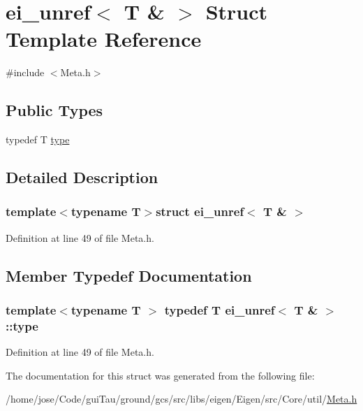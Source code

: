 \hypertarget{structei__unref_3_01_t_01_6_01_4}{\section{ei\-\_\-unref$<$ T \& $>$ Struct Template Reference}
\label{structei__unref_3_01_t_01_6_01_4}
}


{\ttfamily \#include $<$Meta.\-h$>$}

\subsection*{Public Types}
\begin{DoxyCompactItemize}
\item 
typedef T \hyperlink{structei__unref_3_01_t_01_6_01_4_acd5f4cab79b94a92a9dd8cbf9e54af05}{type}
\end{DoxyCompactItemize}


\subsection{Detailed Description}
\subsubsection*{template$<$typename T$>$struct ei\-\_\-unref$<$ T \& $>$}



Definition at line 49 of file Meta.\-h.



\subsection{Member Typedef Documentation}
\hypertarget{structei__unref_3_01_t_01_6_01_4_acd5f4cab79b94a92a9dd8cbf9e54af05}{
\subsubsection[{type}]{\setlength{\rightskip}{0pt plus 5cm}template$<$typename T $>$ typedef T {\bf ei\-\_\-unref}$<$ T \& $>$\-::{\bf type}}}\label{structei__unref_3_01_t_01_6_01_4_acd5f4cab79b94a92a9dd8cbf9e54af05}


Definition at line 49 of file Meta.\-h.



The documentation for this struct was generated from the following file\-:\begin{DoxyCompactItemize}
\item 
/home/jose/\-Code/gui\-Tau/ground/gcs/src/libs/eigen/\-Eigen/src/\-Core/util/\hyperlink{_meta_8h}{Meta.\-h}\end{DoxyCompactItemize}
